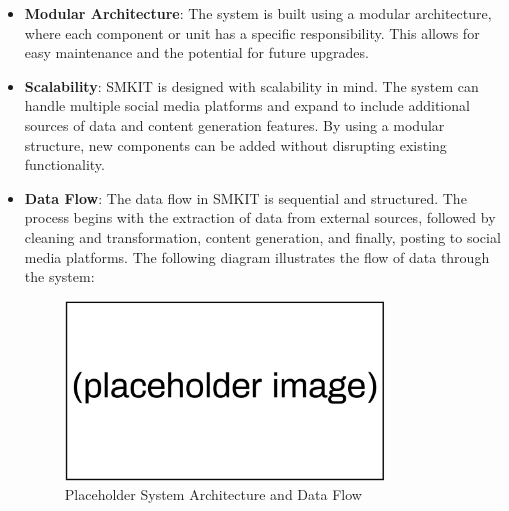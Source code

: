 \begin{itemize}
    \item \textbf{Modular Architecture}: The system is built using a modular architecture, where each component or unit has a specific responsibility. This allows for easy maintenance and the potential for future upgrades. 
    
    
    \item \textbf{Scalability}: SMKIT is designed with scalability in mind. The system can handle multiple social media platforms and expand to include additional sources of data and content generation features. By using a modular structure, new components can be added without disrupting existing functionality.
    
    \item \textbf{Data Flow}: The data flow in SMKIT is sequential and structured. The process begins with the extraction of data from external sources, followed by cleaning and transformation, content generation, and finally, posting to social media platforms. The following diagram illustrates the flow of data through the system:
    
    \begin{figure}[ht]
        \centering
        \includegraphics[width=0.8\textwidth]{figures/methodology/placeholder_image.png}
        \caption{Placeholder System Architecture and Data Flow}
        \label{fig:methodology_system_architecture_and_data_flow}
    \end{figure}


\end{itemize}
